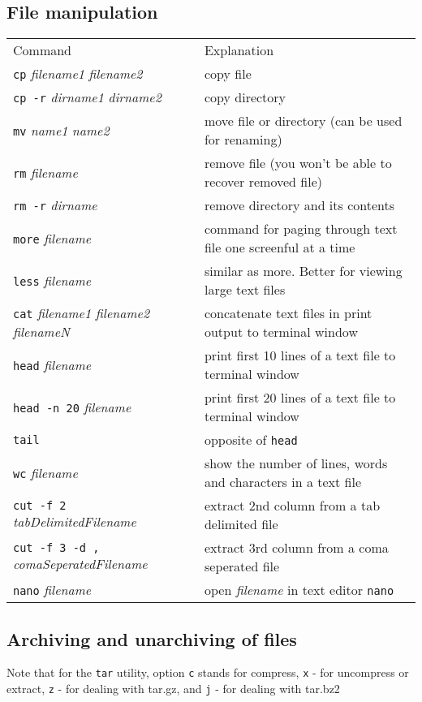 \subsection{File manipulation}
\begin{tabular}{ll}
  Command & Explanation \\
  \hhline{==}
  \texttt{cp} \textit{filename1} \textit{filename2} & copy file \\
  \texttt{cp -r} \textit{dirname1} \textit{dirname2} & copy directory \\
  \texttt{mv} \textit{name1} \textit{name2} & move file or directory (can be used for renaming) \\
  \texttt{rm} \textit{filename} & remove file (you won't be able to recover removed file) \\
  \texttt{rm -r} \textit{dirname} & remove directory and its contents \\
  \texttt{more} \textit{filename} & command for paging through text file one screenful at a time \\
  \texttt{less} \textit{filename} & similar as more. Better for viewing large text files \\
  \texttt{cat} \textit{filename1 filename2 filenameN} & concatenate text files in print output to terminal window \\
  \texttt{head} \textit{filename} & print first 10 lines of a text file to terminal window \\
  \texttt{head -n 20} \textit{filename} &  print first 20 lines of a text file to terminal window \\
  \texttt{tail} & opposite of \texttt{head} \\
  \texttt{wc} \textit{filename} & show the number of lines, words and characters in a text file \\
  \texttt{cut -f 2} \textit{tabDelimitedFilename} & extract 2nd column from a tab delimited file \\
  \texttt{cut -f 3 -d ,} \textit{comaSeperatedFilename} & extract 3rd column from a coma seperated file \\
  \texttt{nano} \textit{filename} & open \textit{filename} in text editor \texttt{nano} \\
\end{tabular}

\subsection{Archiving and unarchiving of files}
Note that for the \texttt{tar} utility, option \texttt{c} stands for compress, 
\texttt{x} - for uncompress or extract, \texttt{z} - for dealing with tar.gz,
and \texttt{j} - for dealing with tar.bz2\\~\\
